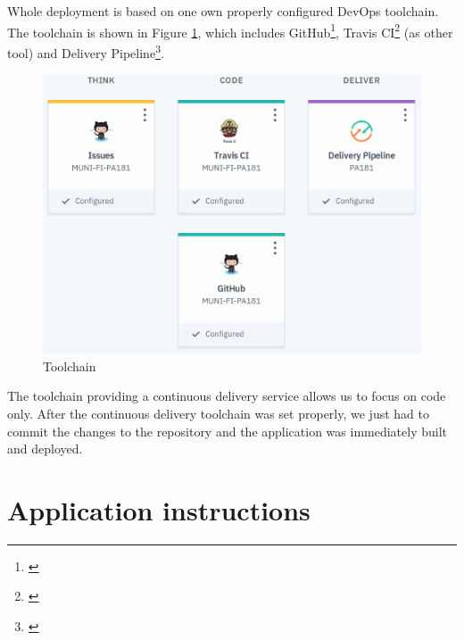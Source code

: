 \documentclass[11pt,a4paper]{article}
\begin{document}
Whole deployment is based on one own properly configured DevOps toolchain. The toolchain is shown in Figure \ref{fig:toolchain}, which includes GitHub\footnote{\href{https://console.bluemix.net/docs/services/ContinuousDelivery/toolchains\_integrations.html\#github}{\color{urlColor}{console.bluemix.net/docs/services/ContinuousDelivery/toolchains\_integrations.html\#github}}}, Travis CI\footnote{\href{https://console.bluemix.net/docs/services/ContinuousDelivery/toolchains\_integrations.html\#othertool}{\color{urlColor}{console.bluemix.net/docs/services/ContinuousDelivery/toolchains\_integrations.html\#othertool}}} (as other tool) and Delivery Pipeline\footnote{\href{https://console.bluemix.net/docs/services/ContinuousDelivery/toolchains\_integrations.html\#deliverypipeline}{\color{urlColor}{console.bluemix.net/docs/services/ContinuousDelivery/toolchains\_integrations.html\#deliverypipeline}}}.

\begin{figure}[H]
    \centering
    \includegraphics[scale=0.3]{img/toolchain.png}
    \caption{Toolchain}
    \label{fig:toolchain}
\end{figure}

The toolchain providing a continuous delivery service allows us to focus on code only. After the continuous delivery toolchain was set properly, we just had to commit the changes to the repository and the application was immediately built and deployed.

\section{Application instructions}
\end{document}
